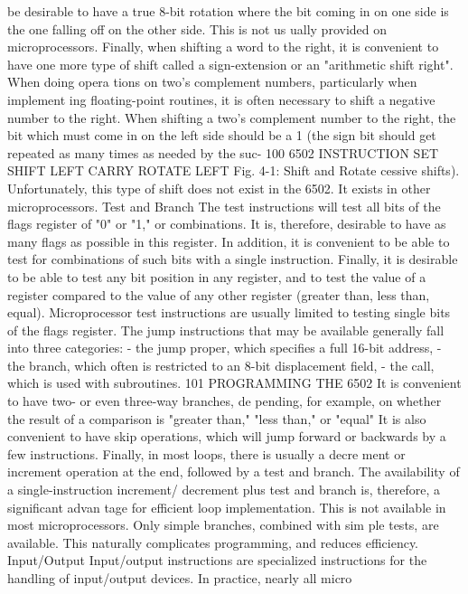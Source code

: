 \documentclass{book}
\begin{document}
be desirable to have a true 8-bit rotation where the bit coming in
on one side is the one falling off on the other side. This is not us
ually provided on microprocessors. Finally, when shifting a word
to the right, it is convenient to have one more type of shift called
a sign-extension or an "arithmetic shift right". When doing opera
tions on two's complement numbers, particularly when implement
ing floating-point routines, it is often necessary to shift a negative
number to the right. When shifting a two's complement number to
the right, the bit which must come in on the left side should be a 1
(the sign bit should get repeated as many times as needed by the suc-
100
6502 INSTRUCTION SET
SHIFT LEFT
CARRY
ROTATE LEFT
Fig. 4-1: Shift and Rotate
cessive shifts). Unfortunately, this type of shift does not exist in the
6502. It exists in other microprocessors.
Test and Branch
The test instructions will test all bits of the flags register of "0"
or "1," or combinations. It is, therefore, desirable to have as many
flags as possible in this register. In addition, it is convenient to be
able to test for combinations of such bits with a single instruction.
Finally, it is desirable to be able to test any bit position in any
register, and to test the value of a register compared to the value of
any other register (greater than, less than, equal). Microprocessor
test instructions are usually limited to testing single bits of the
flags register.
The jump instructions that may be available generally fall into
three categories:
- the jump proper, which specifies a full 16-bit address,
- the branch, which often is restricted to an 8-bit displacement
field,
- the call, which is used with subroutines.
101
PROGRAMMING THE 6502
It is convenient to have two- or even three-way branches, de
pending, for example, on whether the result of a comparison is
"greater than," "less than," or "equal" It is also convenient to
have skip operations, which will jump forward or backwards by a
few instructions. Finally, in most loops, there is usually a decre
ment or increment operation at the end, followed by a test and
branch. The availability of a single-instruction increment/
decrement plus test and branch is, therefore, a significant advan
tage for efficient loop implementation. This is not available in
most microprocessors. Only simple branches, combined with sim
ple tests, are available. This naturally complicates programming,
and reduces efficiency.
Input/Output
Input/output instructions are specialized instructions for the
handling of input/output devices. In practice, nearly all micro
\end{document}
